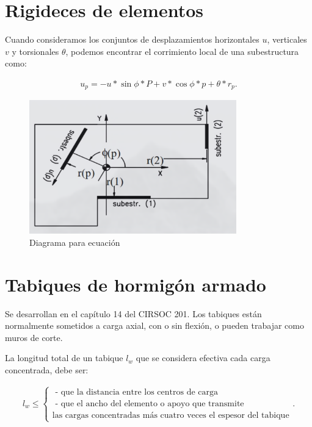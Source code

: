 \documentclass[../main.tex]{subfiles}
\begin{document}
\section{Rigideces de elementos}

Cuando consideramos los conjuntos de desplazamientos horizontales $u$, 
verticales  $v$ y torsionales $\theta$, podemos encontrar el corrimiento
local de una subestructura como:


\begin{align*}
  u_p = - u * \sin{\phi * P} + v*\cos \phi*p + \theta * r_p
.\end{align*}

\begin{figure}[htpb]
  \centering
  \includegraphics[width=0.8\textwidth]{../images/20210608/diagrama.png}
  \caption{Diagrama para ecuación}
  \label{fig:diagrama}
\end{figure}

\section{Tabiques de hormigón armado}

Se desarrollan en el capítulo 14 del CIRSOC 201. Los tabiques están normalmente
sometidos a carga axial, con o sin flexión, o pueden trabajar como muros de
corte.

La longitud total de un tabique $l_w$ que se considera efectiva cada carga
concentrada, debe ser:

 \begin{align*}
  l_w \leq \begin{cases} \text{ - que la distancia entre los centros de carga} \\
    \text{ - que el ancho del elemento o apoyo que transmite} \\
    \text{las cargas concentradas más cuatro veces el espesor del tabique}
  \end{cases}
.\end{align*}
\end{document}
